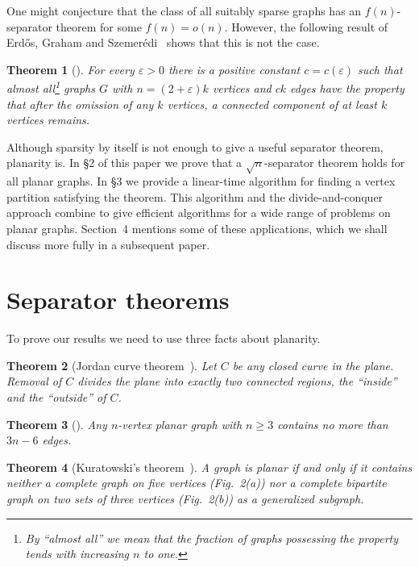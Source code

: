 \documentclass[12pt]{article}
\newtheorem{theorem}{Theorem}
\theoremstyle{remark}
\begin{document}
One might conjecture that the class of all suitably sparse graphs has an
$f(n)$-separator theorem for some $f(n)=o(n)$. However, the following result of
Erd\H{o}s, Graham and Szemer\'{e}di~\cite{erdos75} shows that this is not the case.

\begin{theorem}[\cite{erdos75}]
\label{thm:erdos}
For every $\varepsilon > 0$ there is a positive constant $c = c(\varepsilon)$ such
that almost all\footnote{By ``almost all'' we mean that the fraction of graphs
possessing the property tends with increasing $n$ to one.} graphs $G$ with
$n = (2+\varepsilon)k$ vertices and $ck$ edges have the property that after the
omission of any $k$ vertices, a connected component of at least $k$ vertices
remains.
\end{theorem}

Although sparsity by itself is not enough to give a useful separator theorem,
planarity is. In \S2 of this paper we prove that a $\sqrt{n}$-separator theorem holds
for all planar graphs. In \S3 we provide a linear-time algorithm for finding a vertex
partition satisfying the theorem. This algorithm and the divide-and-conquer approach
combine to give efficient algorithms for a wide range of problems on planar graphs.
Section~4 mentions some of these applications, which we shall discuss more fully in a
subsequent paper.

\section{Separator theorems}

To prove our results we need to use three facts about planarity.

\begin{theorem}[Jordan curve theorem~\cite{hall55}]
\label{thm:jordan}
Let $C$ be any closed curve in the plane. Removal of $C$ divides the plane into
exactly two connected regions, the ``inside'' and the ``outside'' of $C$.
\end{theorem}

\begin{theorem}[\cite{harary69}]
\label{thm:edges}
Any $n$-vertex planar graph with $n \geq 3$ contains no more than $3n-6$ edges.
\end{theorem}

\begin{theorem}[Kuratowski's theorem~\cite{kuratowski30}]
\label{thm:kuratowski}
A graph is planar if and only if it contains neither a complete graph on five
vertices (Fig.~2(a)) nor a complete bipartite graph on two sets of three vertices
(Fig.~2(b)) as a generalized subgraph.
\end{theorem}
\end{document}
